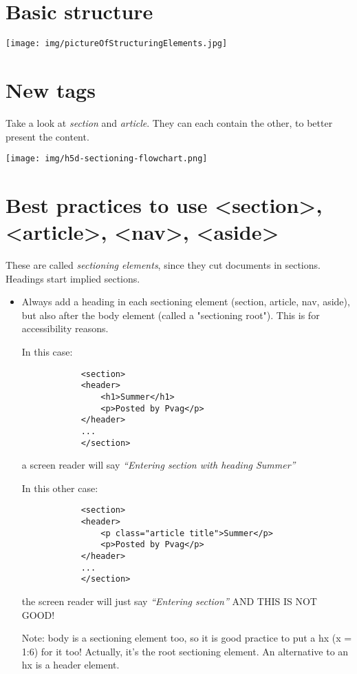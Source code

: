 \documentclass[a4paper,11pt]{book}
\begin{document}
    \section{Basic structure}
    \texttt{[image: img/pictureOfStructuringElements.jpg]}

    \section{New tags}
    Take a look at \emph{section} and \emph{article}. They can each contain the other, to better present
    the content.

    \texttt{[image: img/h5d-sectioning-flowchart.png]}

    \section{Best practices to use <section>, <article>, <nav>, <aside>}
    These are called \emph{sectioning elements}, since they cut documents in sections.
    Headings start implied sections.
    \begin{itemize}
        \item Always add a heading in each sectioning element (section, article, nav, aside),
            but also after the body element (called a "sectioning root").
            This is for accessibility reasons.

            In this case:
            \begin{verbatim}
            <section>
            <header>
                <h1>Summer</h1>
                <p>Posted by Pvag</p>
            </header>
            ...
            </section>
            \end{verbatim}
            a screen reader will say
            \emph{``Entering section with heading Summer''}

            In this other case:
            \begin{verbatim}
            <section>
            <header>
                <p class="article title">Summer</p>
                <p>Posted by Pvag</p>
            </header>
            ...
            </section>
            \end{verbatim}
            the screen reader will just say
            \emph{``Entering section''} \large{AND THIS IS NOT GOOD!}

            Note: body is a sectioning element too, so it is good practice
            to put a hx (x = 1:6) for it too! Actually, it's the root sectioning
            element. An alternative to an hx is a header element.
    \end{itemize}
\end{document}
